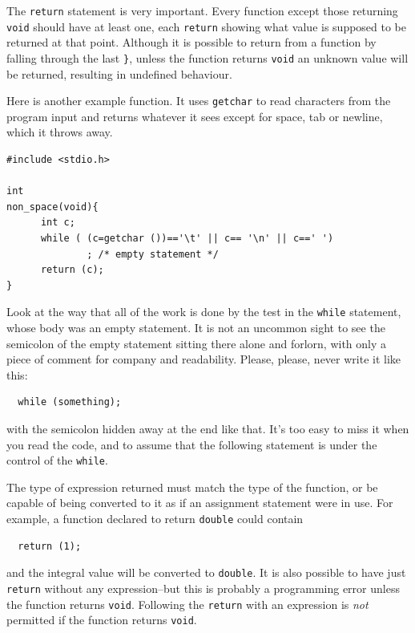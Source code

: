    The \texttt{return} statement is very important. Every function
    except those returning \texttt{void} should have at least one, each
    \texttt{return} showing what value is supposed to be returned at
    that point. Although it is possible to return from a function by falling
    through the last \texttt{\}}, unless the function returns
    \texttt{void} an unknown value will be returned, resulting in
    undefined behaviour.


   Here is another example function. It uses \texttt{getchar} to read
    characters from the program input and returns whatever it sees except
    for space, tab or newline, which it throws away.


\begin{Verbatim}
#include <stdio.h>

int
non_space(void){
      int c;
      while ( (c=getchar ())=='\t' || c== '\n' || c==' ')
              ; /* empty statement */
      return (c);
}
\end{Verbatim}

   Look at the way that all of the work is done by the test in the
    \texttt{while} statement, whose body was an empty statement. It is
    not an uncommon sight to see the semicolon of the empty statement
    sitting there alone and forlorn, with only a piece of comment for
    company and readability. Please, please, never write it like this:

\begin{Verbatim}
  while (something);
\end{Verbatim}

   with the semicolon hidden away at the end like that. It's too easy to
    miss it when you read the code, and to assume that the following
    statement is under the control of the \texttt{while}.


   The type of expression returned must match the type of the function,
    or be capable of being converted to it as if an assignment statement
    were in use. For example, a function declared to return
    \texttt{double} could contain

\begin{Verbatim}
  return (1);
\end{Verbatim}

   and the integral value will be converted to \texttt{double}. It is
    also possible to have just \texttt{return} without any
    expression--but this is probably a programming error unless the
    function returns \texttt{void}. Following the \texttt{return}
    with an expression is \textit{not} permitted if the function returns
    \texttt{void}.


